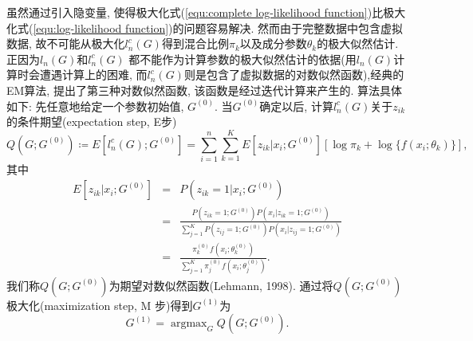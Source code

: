 \documentclass[a4paper,12pt,openany,oneside,utf-8]{ctexbook}
\begin{document}
虽然通过引入隐变量, 使得极大化式(\ref{equ:complete log-likelihood function})比极大化式(\ref{equ:log-likelihood function})的问题容易解决. 然而由于完整数据中包含虚拟数据, 故不可能从极大化$l_{n}^{c}(G)$得到混合比例$\pi_{k}$以及成分参数$\theta_{k}$的极大似然估计. 正因为$l_{n}(G)$和$l_{n}^{c}(G)$ 都不能作为计算参数的极大似然估计的依据(用$l_{n}(G)$计算时会遭遇计算上的困难, 而$l_{n}^{c}(G)$则是包含了虚拟数据的对数似然函数),经典的EM算法, 提出了第三种对数似然函数, 该函数是经过迭代计算来产生的. 算法具体如下: 先任意地给定一个参数初始值, $G^{(0)}$. 当$G^{(0)}$确定以后, 计算$l_{n}^{c}(G)$关于$z_{ik}$ 的条件期望(expectation step, E步)
\begin{equation}
\label{equ:Q function in the first step}
  Q(G;G^{(0)}) \coloneqq E[l_{n}^{c}(G);G^{(0)}] = \sum_{i=1}^{n} \sum_{k=1}^{K} E[z_{ik}|x_i;G^{(0)}] [ \log\pi_{k} + \log\{f(x_{i}; \theta_{k})\} ],
\end{equation}
其中
\begin{eqnarray}
\label{equ:conditional expectation of z_ik in Q function in the first step}
  E[z_{ik}|x_i;G^{(0)}]
  \!&=&\! P(z_{ik}=1|x_i;G^{(0)}) \nonumber\\ %
  \!&=&\! \frac{ P(z_{ik}=1;G^{(0)}) P(x_i|z_{ik}=1;G^{(0)}) }{ \sum_{j=1}^{K} P(z_{ij}=1;G^{(0)}) P(x_i|z_{ij}=1;G^{(0)}) } \nonumber\\
  \!&=&\! \frac{ \pi_k^{(0)} f(x_i; \theta_{k}^{(0)}) }{ \sum_{j=1}^{K} \pi_j^{(0)} f(x_i; \theta_{j}^{(0)}) }.
\end{eqnarray}
我们称$Q(G;G^{(0)})$为期望对数似然函数(Lehmann, 1998). 通过将$Q(G;G^{(0)})$极大化(maximization step, M 步)得到$G^{(1)}$为
\begin{equation}
  G^{(1)}=\mathop{\arg\max}_{G} Q(G;G^{(0)}).
\end{equation}
\end{document}
